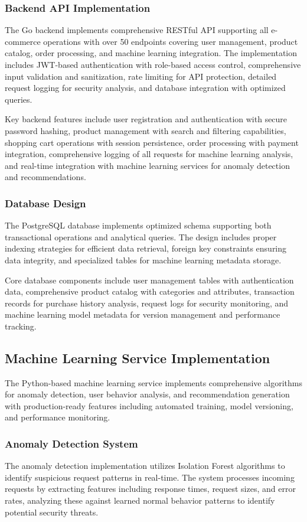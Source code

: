 \documentclass[12pt]{article}
\begin{document}
\subsubsection{Backend API Implementation}
The Go backend implements comprehensive RESTful API supporting all e-commerce operations with over 50 endpoints covering user management, product catalog, order processing, and machine learning integration. The implementation includes JWT-based authentication with role-based access control, comprehensive input validation and sanitization, rate limiting for API protection, detailed request logging for security analysis, and database integration with optimized queries.

Key backend features include user registration and authentication with secure password hashing, product management with search and filtering capabilities, shopping cart operations with session persistence, order processing with payment integration, comprehensive logging of all requests for machine learning analysis, and real-time integration with machine learning services for anomaly detection and recommendations.

\subsubsection{Database Design}
The PostgreSQL database implements optimized schema supporting both transactional operations and analytical queries. The design includes proper indexing strategies for efficient data retrieval, foreign key constraints ensuring data integrity, and specialized tables for machine learning metadata storage.

Core database components include user management tables with authentication data, comprehensive product catalog with categories and attributes, transaction records for purchase history analysis, request logs for security monitoring, and machine learning model metadata for version management and performance tracking.

\subsection{Machine Learning Service Implementation}
The Python-based machine learning service implements comprehensive algorithms for anomaly detection, user behavior analysis, and recommendation generation with production-ready features including automated training, model versioning, and performance monitoring.

\subsubsection{Anomaly Detection System}
The anomaly detection implementation utilizes Isolation Forest algorithms to identify suspicious request patterns in real-time. The system processes incoming requests by extracting features including response times, request sizes, and error rates, analyzing these against learned normal behavior patterns to identify potential security threats.
\end{document}
